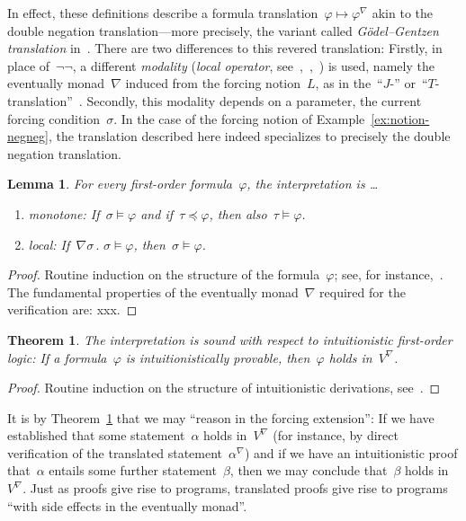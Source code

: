 \documentclass[com,11pt,crcready]{iosart2x}
\theoremstyle{definition}
\theoremstyle{plain}
\newtheorem{lemma}[definition]{Lemma}
\newtheorem{theorem}[definition]{Theorem}
\theoremstyle{remark}
\newcommand{\?}{\,{:}\,}
\newcommand{\forces}{\vDash}
\renewcommand{\_}{\mathpunct{.}\,}
\begin{document}
In effect, these definitions describe a formula translation~$\varphi \mapsto
\varphi^\nabla$ akin to the double negation translation---more precisely, the
variant called \emph{Gödel--Gentzen translation} in~\cite{ferreira-oliva:translation2,ferreira-oliva:translation}.
There are two differences to this revered translation: Firstly, in place
of~$\neg\neg$, a different \emph{modality} (\emph{local operator},
see~\cite[Section~14.5]{goldblatt:topoi},~\cite{goldblatt:modality},~\cite{pfenning-davies:reconstruction})
is used, namely the eventually monad~$\nabla$ induced from the forcing
notion~$L$, as in the~``$J$-'' or~``$T$-translation''~\cite{aczel:russell-prawitz,escardo-oliva:peirce-shift}.
Secondly, this modality depends on a parameter, the current forcing
condition~$\sigma$. In the case of the forcing notion of
Example~\ref{ex:notion-negneg}, the translation described here indeed
specializes to precisely the double negation translation.

\begin{lemma}\label{lemma:kj-basics}For every first-order formula~$\varphi$,
the interpretation is \ldots
\begin{enumerate}
\item[(a)] monotone: If~$\sigma \forces \varphi$ and if~$\tau \preceq \varphi$,
then also~$\tau \forces \varphi$.
\item[(b)] local: If~$\nabla\sigma\_ \sigma \forces \varphi$,
then~$\sigma \forces \varphi$.
\end{enumerate}
\end{lemma}

\begin{proof}Routine induction on the structure of the formula~$\varphi$; see,
for instance,~\cite{xxx}. The fundamental properties of the eventually
monad~$\nabla$ required for the verification are: xxx.\end{proof}

\begin{theorem}\label{thm:kj-sound}The interpretation is sound with respect to
intuitionistic first-order logic: If a formula~$\varphi$ is intuitionistically
provable, then~$\varphi$ holds in~$V^\nabla$.\end{theorem}

\begin{proof}Routine induction on the structure of intuitionistic derivations,
see~\cite{xxx}.\end{proof}

It is by Theorem~\ref{thm:kj-sound} that we may ``reason in the forcing
extension'': If we have established that some statement~$\alpha$ holds
in~$V^\nabla$ (for instance, by direct verification of the translated
statement~$\alpha^\nabla$) and if we have an intuitionistic proof that~$\alpha$
entails some further statement~$\beta$, then we may conclude that~$\beta$ holds
in~$V^\nabla$. Just as proofs give rise to programs, translated proofs give
rise to programs ``with side effects in the eventually monad''.
\end{document}
